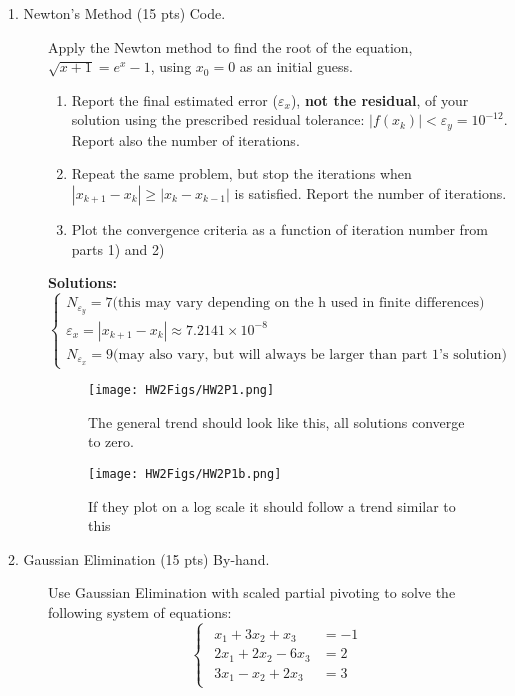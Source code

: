 \documentclass[12pt]{article}
\begin{document}
\begin{description}
\item[1. Newton's Method (15 pts) Code.] Apply the Newton method to find the root of the equation, $\sqrt{x+1} = e^{x} - 1$, using $x_0 = 0$ as an initial guess.
\begin{enumerate}
    \item Report the final estimated error ($ \varepsilon_x$), {\bf not the residual}, of your solution using the prescribed residual tolerance: $| f(x_k) | < \varepsilon_y = 10^{-12}$. Report also the number of iterations. 
    \item Repeat the same problem, but stop the iterations when $| x_{k+1} - x_k | \ge | x_k - x_{k-1} |$ is satisfied. Report the number of iterations.
    \item Plot the convergence criteria as a function of iteration number from parts 1) and 2)
\end{enumerate}

\ifsolution
\color{red}
\textbf{Solutions:} \\
\begin{equation*}
\begin{cases}
N_{\varepsilon_{y}} = 7 \text{(this may vary depending on the h used in finite differences)} \\
\varepsilon_{x} = \left|x_{k+1}-x_{k}\right| \approx 7.2141 \times 10^{-8} \\
N_{\varepsilon_{x}} = 9 \text{(may also vary, but will always be larger than part 1's solution)}
\end{cases}
\end{equation*}

\begin{figure}[h!]
	\centering\texttt{[image: HW2Figs/HW2P1.png]}
	\caption{The general trend should look like this, all solutions converge to zero.}
    \centering\texttt{[image: HW2Figs/HW2P1b.png]}
	\caption{If they plot on a log scale it should follow a trend similar to this}
	\label{fig:linearMethods}
\end{figure}

\color{black}
\fi

\item[2. Gaussian Elimination (15 pts) By-hand.] Use Gaussian Elimination with scaled partial pivoting to solve the following system of equations:
    \begin{equation*}
    \begin{cases}
    \begin{aligned}
    x_1 + 3x_2 + x_3 &= -1 \\ 
    2x_1 + 2x_2 - 6x_3 &= 2 \\ 
    3x_1 - x_2 + 2x_3 &= 3
    \end{aligned}
    \end{cases}
    \end{equation*}


\end{description}
\end{document}
